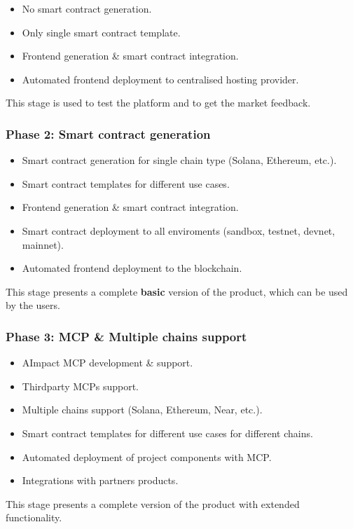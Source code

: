 \documentclass[12pt,a4paper]{article}
\begin{document}
\begin{itemize}
    \item No smart contract generation.
    \item Only single smart contract template.
    \item Frontend generation \& smart contract integration.
    \item Automated frontend deployment to centralised hosting provider.
\end{itemize}

This stage is used to test the platform and to get the market feedback.

\subsubsection{Phase 2: Smart contract generation}

\begin{itemize}
    \item Smart contract generation for single chain type (Solana, Ethereum, etc.).
    \item Smart contract templates for different use cases.
    \item Frontend generation \& smart contract integration.
    \item Smart contract deployment to all enviroments (sandbox, testnet, devnet, mainnet).
    \item Automated frontend deployment to the blockchain.
\end{itemize}

This stage presents a complete \textbf{basic} version of the product, which can be used by the users.


\subsubsection{Phase 3: MCP \& Multiple chains support }

\begin{itemize}
    \item AImpact MCP development \& support.
    \item Thirdparty MCPs support.
    \item Multiple chains support (Solana, Ethereum, Near, etc.).
    \item Smart contract templates for different use cases for different chains.
    \item Automated deployment of project components with MCP.
    \item Integrations with partners products.
\end{itemize}

This stage presents a complete version of the product with extended functionality.

\end{document}
